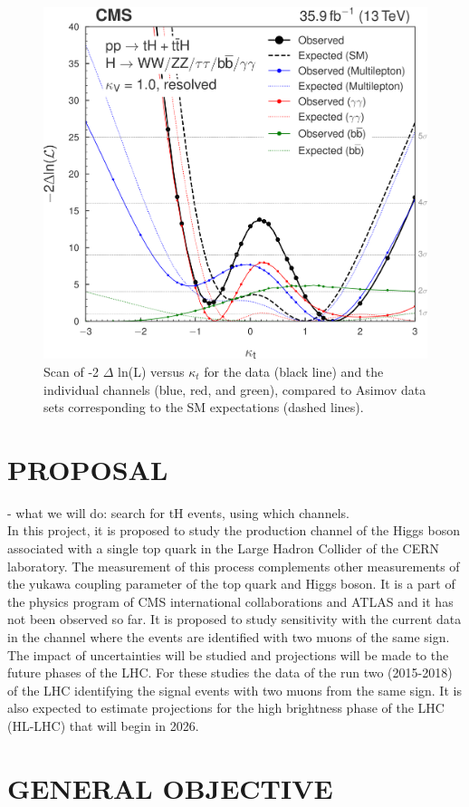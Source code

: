 \documentclass[final,3p]{CSP}
\begin{document}
 \begin{figure}[H]
  \centering
   \includegraphics[width=0.5 \columnwidth]{./cms13.png}
  \caption{Scan of -2 $\Delta$ ln(L) versus $\kappa_t$ for the data (black line) and the individual channels (blue, red, and green), compared to Asimov data sets corresponding to the SM expectations (dashed lines).}
   \label{figure 9}
\end{figure}

\section{PROPOSAL}

- what we will do:  search for tH events, using which channels.\\

In this project, it is proposed to study the production channel of the Higgs boson associated 
with a single top quark in the Large Hadron Collider of the CERN laboratory. The measurement 
of this process complements other measurements of the yukawa coupling parameter of the top 
quark and Higgs boson. It is a part of the physics program of CMS international 
collaborations and ATLAS and it has not been observed so far. It is proposed to study 
sensitivity with the current data in the channel where the events are identified with two 
muons of the same sign. The impact of uncertainties will be studied and projections will be 
made to the future phases of the LHC. For these studies the data of the run two (2015-2018) 
of the LHC identifying the signal events with two muons from the same sign. It is also 
expected to estimate projections for the high brightness phase of the LHC (HL-LHC) that will begin 
in 2026. 

\section{GENERAL OBJECTIVE}
\end{document}
